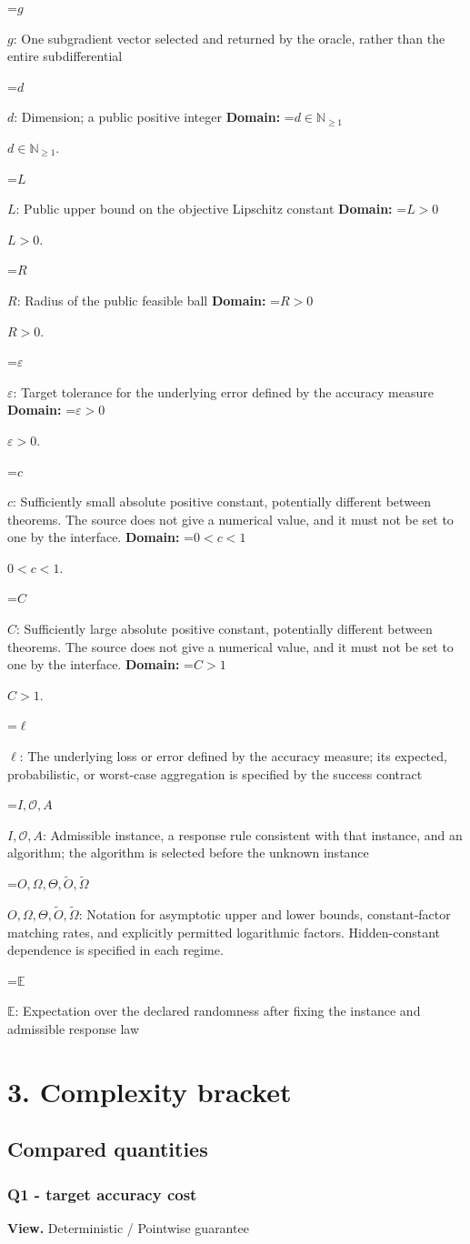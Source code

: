 \documentclass[10pt,a4paper]{article}
\newcommand{\AtlasMath}[1]{\par\begingroup\centering\setbox0=\hbox{$\displaystyle #1$}\ifdim\wd0>1.4\linewidth\typeout{ATLAS WIDE FORMULA: \the\wd0}\fi\ifdim\wd0>\linewidth\resizebox{\linewidth}{!}{\box0}\else\box0\fi\par\endgroup}
\newcommand{\AtlasInlineMath}[1]{\begingroup\setbox0=\hbox{$#1$}\ifdim\wd0>.4\linewidth\endgroup\AtlasMath{#1}\else\endgroup$#1$\fi}
\begin{document}
\AtlasInlineMath{g}: One subgradient vector selected and returned by the oracle, rather than the entire subdifferential

\AtlasInlineMath{d}: Dimension; a public positive integer \textbf{Domain:} \AtlasInlineMath{d\in\mathbb{N}_{\ge1}}.

\AtlasInlineMath{L}: Public upper bound on the objective Lipschitz constant \textbf{Domain:} \AtlasInlineMath{L>0}.

\AtlasInlineMath{R}: Radius of the public feasible ball \textbf{Domain:} \AtlasInlineMath{R>0}.

\AtlasInlineMath{\varepsilon}: Target tolerance for the underlying error defined by the accuracy measure \textbf{Domain:} \AtlasInlineMath{\varepsilon>0}.

\AtlasInlineMath{c}: Sufficiently small absolute positive constant, potentially different between theorems. The source does not give a numerical value, and it must not be set to one by the interface. \textbf{Domain:} \AtlasInlineMath{0<c<1}.

\AtlasInlineMath{C}: Sufficiently large absolute positive constant, potentially different between theorems. The source does not give a numerical value, and it must not be set to one by the interface. \textbf{Domain:} \AtlasInlineMath{C>1}.

\AtlasInlineMath{\ell}: The underlying loss or error defined by the accuracy measure; its expected, probabilistic, or worst-case aggregation is specified by the success contract

\AtlasInlineMath{I,\mathcal{O},A}: Admissible instance, a response rule consistent with that instance, and an algorithm; the algorithm is selected before the unknown instance

\AtlasInlineMath{O,\Omega,\Theta,\widetilde{O},\widetilde\Omega}: Notation for asymptotic upper and lower bounds, constant-factor matching rates, and explicitly permitted logarithmic factors. Hidden-constant dependence is specified in each regime.

\AtlasInlineMath{\mathbb{E}}: Expectation over the declared randomness after fixing the instance and admissible response law

\section{3. Complexity bracket}
\subsection{Compared quantities}
\subsubsection{Q1 - target accuracy cost}
\textbf{View.} Deterministic / Pointwise guarantee
\end{document}
